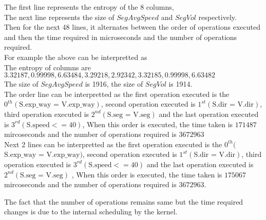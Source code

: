The first line represents the entropy of the $8$ columns,\\
The next line represents the size of $SegAvgSpeed$ and $SegVol$ respectively.\\
Then for the next 48 lines, it alternates between the order of operations executed and then the time required in microseconds and the number of operations required.\\
For example the above can be interpretted as\\
The entropy of columns are $3.32187,0.99998,6.63484,3.29218,2.92342,3.32185,0.99998,6.63482$\\
The size of $SegAvgSpeed$ is 1916, the size of $SegVol$ is 1914.\\
The order line can be interpretted as the first operation executed is the $0^{th}(\text{S.exp\_way = V.exp\_way})$, second operation executed is $1^{st}(\text{S.dir = V.dir})$, third operation executed is $2^{nd}(\text{S.seg = V.seg})$ and the last operation executed is $3^{rd}(\text{S.speed} <= 40)$, When this order is executed, the time taken is $171487$ mircoseconds and the number of operations required is $3672963$\\
Next 2 lines can be interpretted as the first operation executed is the $0^{th}($$\text{S.exp\_way = V.exp\_way})$, second operation executed is $1^{st}(\text{S.dir = V.dir})$, third operation executed is $3^{rd}(\text{S.speed} <= 40)$ and the last operation executed is $2^{nd}(\text{S.seg = V.seg})$ , When this order is executed, the time taken is $175067$ mircoseconds and the number of operations required is $3672963$. 
\par The fact that the number of operations remains same but the time required changes is due to the internal scheduling by the kernel.
 
